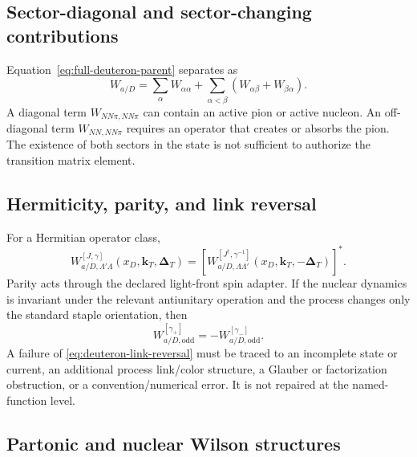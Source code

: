 \documentclass[11pt]{article}
\newcommand{\kT}{\bm{k}_{T}}
\newcommand{\DT}{\bm{\Delta}_{T}}
\newcommand{\NN}{NN}
\newcommand{\NNpi}{NN\pi}
\newcommand{\odd}{\mathrm{odd}}
\begin{document}
\subsection{Sector-diagonal and sector-changing contributions}

Equation~\eqref{eq:full-deuteron-parent} separates as
\begin{equation}
 W_{a/D}
 =\sum_\alpha W_{\alpha\alpha}
 +\sum_{\alpha<\beta}
 \left(W_{\alpha\beta}+W_{\beta\alpha}\right).
\label{eq:sector-decomposition-parent}
\end{equation}
A diagonal term \(W_{\NNpi,\NNpi}\) can contain an active pion or active
nucleon.  An off-diagonal term \(W_{\NN,\NNpi}\) requires an operator that
creates or absorbs the pion.  The existence of both sectors in the state is
not sufficient to authorize the transition matrix element.

\subsection{Hermiticity, parity, and link reversal}

For a Hermitian operator class,
\begin{equation}
 W_{a/D,\Lambda'\Lambda}^{[J,\gamma]}
 (x_D,\kT,\DT)
 =
 \left[
 W_{a/D,\Lambda\Lambda'}^{[J^\dagger,\gamma^{-1}]}
 (x_D,\kT,-\DT)
 \right]^*.
\label{eq:deuteron-parent-hermiticity}
\end{equation}
Parity acts through the declared light-front spin adapter.  If the nuclear
dynamics is invariant under the relevant antiunitary operation and the
process changes only the standard staple orientation, then
\begin{equation}
 W_{a/D,\odd}^{[\gamma_+]}
 =-W_{a/D,\odd}^{[\gamma_-]}.
\label{eq:deuteron-link-reversal}
\end{equation}
A failure of \cref{eq:deuteron-link-reversal} must be traced to an incomplete
state or current, an additional process link/color structure, a Glauber or
factorization obstruction, or a convention/numerical error.  It is not
repaired at the named-function level.

\subsection{Partonic and nuclear Wilson structures}
\end{document}
